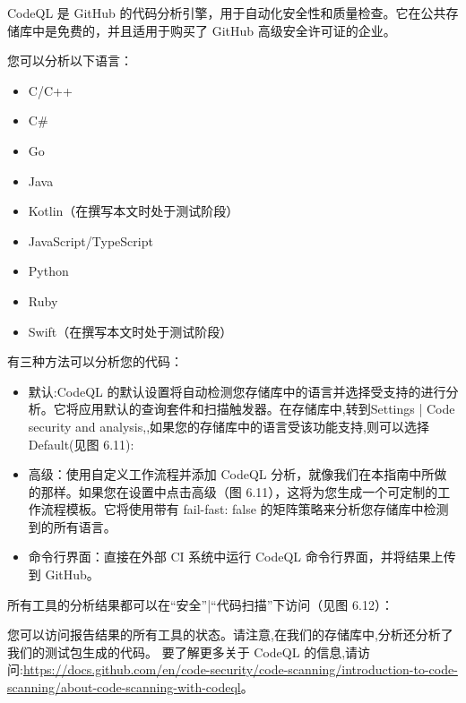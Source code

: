 CodeQL 是 GitHub 的代码分析引擎，用于自动化安全性和质量检查。它在公共存储库中是免费的，并且适用于购买了 GitHub 高级安全许可证的企业。

您可以分析以下语言：

\begin{itemize}
\item 
C/C++

\item 
C\#

\item 
Go

\item 
Java

\item 
Kotlin（在撰写本文时处于测试阶段）

\item 
JavaScript/TypeScript

\item 
Python

\item 
Ruby

\item 
Swift（在撰写本文时处于测试阶段）
\end{itemize}

有三种方法可以分析您的代码：

\begin{itemize}
\item 
默认:CodeQL 的默认设置将自动检测您存储库中的语言并选择受支持的进行分析。它将应用默认的查询套件和扫描触发器。在存储库中,转到Settings | Code security and analysis,,如果您的存储库中的语言受该功能支持,则可以选择Default(见图 6.11):


\item 
高级：使用自定义工作流程并添加 CodeQL 分析，就像我们在本指南中所做的那样。如果您在设置中点击高级（图 6.11），这将为您生成一个可定制的工作流程模板。它将使用带有 fail-fast: false 的矩阵策略来分析您存储库中检测到的所有语言。

\item 
命令行界面：直接在外部 CI 系统中运行 CodeQL 命令行界面，并将结果上传到 GitHub。
\end{itemize}

所有工具的分析结果都可以在“安全”|“代码扫描”下访问（见图 6.12）：


您可以访问报告结果的所有工具的状态。请注意,在我们的存储库中,分析还分析了我们的测试包生成的代码。
要了解更多关于 CodeQL 的信息,请访问:\url{https://docs.github.com/en/code-security/code-scanning/introduction-to-code-scanning/about-code-scanning-with-codeql}。

